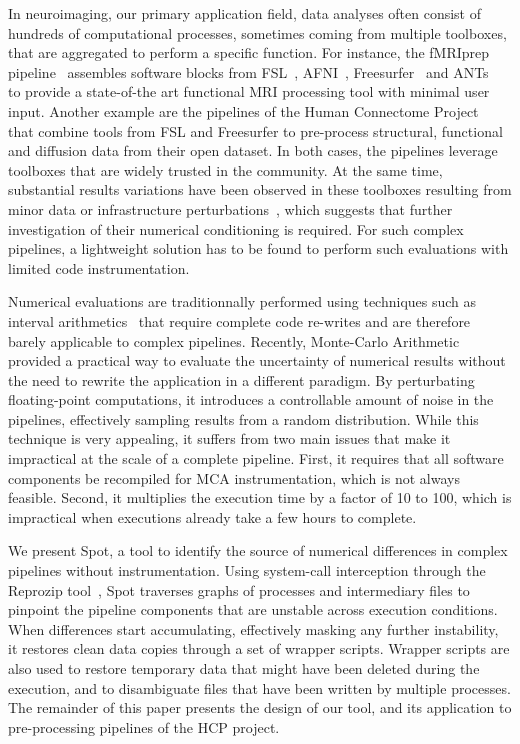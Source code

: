 \documentclass[a4paper,num-refs]{oup-contemporary}
\begin{document}
In neuroimaging, our primary application field, data analyses often consist
of hundreds of computational processes, sometimes coming from multiple
toolboxes, that are aggregated to perform a specific function. For
instance, the fMRIprep pipeline~\cite{esteban2019fmriprep} assembles software blocks
from FSL~\cite{jenkinson2012fsl}, AFNI~\cite{cox2012afni}, Freesurfer~\cite{fischl2012freesurfer} and ANTs~\cite{avants2009advanced} to provide a state-of-the art
functional MRI processing tool with minimal user input. Another example are the pipelines of the Human
Connectome Project~\cite{glasser2013} that combine tools from FSL and Freesurfer to pre-process
structural, functional and diffusion data from their
open dataset. In both cases, the pipelines leverage toolboxes that are
widely trusted in the community. At the same time, substantial results
variations have been observed in these toolboxes resulting from minor data
or infrastructure perturbations~\cite{Glatard2015, Gronenschild2012, Lewis2017-ll}, which suggests that further investigation of their
numerical conditioning is required. For such complex pipelines, a
lightweight solution has to be found to perform such evaluations with
limited code instrumentation.

Numerical evaluations are traditionnally performed using techniques such as
interval arithmetics~\cite{hickey2001interval} that require complete code re-writes and are
therefore barely applicable to complex pipelines. Recently, Monte-Carlo
Arithmetic~\cite{Parker1997-qq, Denis2016-wo} provided a practical way to
evaluate the uncertainty of numerical results without the need to rewrite
the application in a different paradigm. By perturbating floating-point
computations, it introduces a controllable amount of noise in the
pipelines, effectively sampling results from a random distribution. While
this technique is very appealing, it suffers from two main issues that make
it impractical at the scale of a complete pipeline. First, it requires that
all software components be recompiled for MCA instrumentation, which is not
always feasible. Second, it multiplies the execution time by a factor of 10
to 100, which is impractical when executions already take a few hours to
complete. 

We present Spot, a tool to identify the source of numerical differences in
complex pipelines without instrumentation. Using system-call interception
through the Reprozip tool~\cite{chirigati2016reprozip}, Spot traverses graphs of processes and
intermediary files to pinpoint the pipeline components that are unstable
across execution conditions. When differences start accumulating,
effectively masking any further instability, it restores clean data copies
through a set of wrapper scripts. Wrapper scripts are also used to restore
temporary data that might have been deleted during the execution, and to
disambiguate files that have been written by multiple processes. The remainder of this paper 
presents the design of our tool, and its 
application to pre-processing pipelines of the HCP project. 
\end{document}
